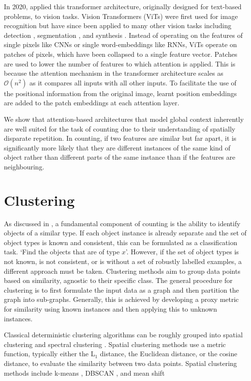 \documentclass[../thesis.tex]{subfiles}
\begin{document}
In 2020, \citet{dosovitskiy2020vit} applied this transformer architecture, originally designed for text-based problems, to vision tasks. Vision Transformers (ViTs) \cite{dosovitskiy2020vit} were first used for image recognition but have since been applied to many other vision tasks including detection \cite{carion2020DETR}, segmentation \cite{caron2021DINO}, and synthesis \cite{rombach2022highresolution}.
Instead of operating on the features of single pixels like CNNs or single word-embeddings like RNNs, ViTs operate on patches of pixels, which have been collapsed to a single feature vector. Patches are used to lower the number of features to which attention is applied. This is because the attention mechanism in the transformer architecture scales as $\mathcal{O}(n^2)$ as it compares all inputs with all other inputs. To facilitate the use of the positional information from the original image, learnt position embeddings are added to the patch embeddings at each attention layer.

We show that attention-based architectures that model global context inherently are well suited for the task of counting due to their understanding of spatially disparate repetition. In counting, if two features are similar but far apart, it is significantly more likely that they are different instances of the same kind of object rather than different parts of the same instance than if the features are neighbouring.


\section{Clustering}\label{sec__litreview__clustering}
As discussed in , a fundamental component of counting is the ability to identify objects of a similar type. 
If each object instance is already separate and the set of object types is known and consistent, this can be formulated as a classification task. 
`Find the objects that are of type $x$'.
However, if the set of object types is not known, is not consistent, or is without a set of robustly labelled examples, a different approach must be taken.
Clustering methods aim to group data points based on similarity, agnostic to their specific class.
The general procedure for clustering is to first formulate the input data as a graph and then partition the graph into sub-graphs.
Generally, this is achieved by developing a proxy metric for similarity using known instances and then applying this to unknown instances.


Classical deterministic clustering algorithms can be roughly grouped into spatial clustering \cite{Lloyd1982,Sander1998} and spectral clustering \cite{VonLuxburg2007}. 
Spatial clustering methods use a metric function, typically either the L$_1$ distance, the Euclidean distance, or the cosine distance, to evaluate the similarity between two data points.
Spatial clustering methods include k-means \cite{Lloyd1982}, DBSCAN \cite{Sander1998}, and mean shift \cite{Fukunaga1975}
\end{document}
